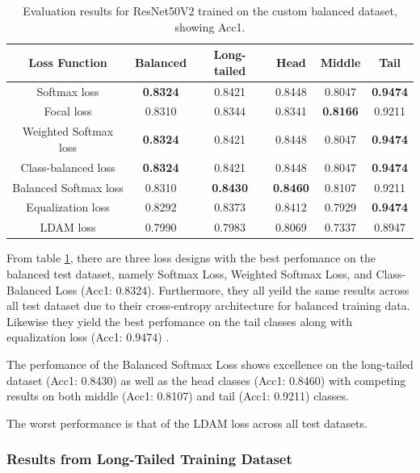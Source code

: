 \begin{table}[H]
    \centering
    \caption{Evaluation results for ResNet50V2 trained on the custom balanced dataset, showing Acc1.}
    \begin{tabular}{cccccc}
        \toprule
        Loss Function & Balanced & Long-tailed & Head & Middle & Tail \\ 
        \midrule
        Softmax loss   & \textbf{0.8324}  & 0.8421 & 0.8448 & 0.8047 & \textbf{0.9474} \\
        Focal loss   & 0.8310  & 0.8344 & 0.8341 & \textbf{0.8166} & 0.9211 \\
        Weighted Softmax loss   & \textbf{0.8324} & 0.8421 & 0.8448 & 0.8047 & \textbf{0.9474} \\
        Class-balanced loss   &  \textbf{0.8324} & 0.8421 & 0.8448 & 0.8047 & \textbf{0.9474} \\
        Balanced Softmax loss   & 0.8310 & \textbf{0.8430} & \textbf{0.8460} & 0.8107 & 0.9211 \\
        Equalization loss   & 0.8292 & 0.8373 & 0.8412 & 0.7929 & \textbf{0.9474} \\
        LDAM loss   & 0.7990 & 0.7983 & 0.8069 & 0.7337 & 0.8947 \\
        \bottomrule
    \end{tabular}
    \label{tab:resnet_bal_acc1_1}
\end{table}

From table \ref{tab:resnet_bal_acc1_1}, there are three loss designs with the best perfomance on the balanced test dataset, namely Softmax Loss, Weighted Softmax Loss, and Class-Balanced Loss (Acc1: 0.8324). Furthermore, they all yeild the same results across all test dataset due to their cross-entropy architecture for balanced training data. Likewise they yield the best perfomance on the tail classes along with equalization loss (Acc1: 0.9474) . %

The perfomance of the Balanced Softmax Loss shows excellence on the long-tailed dataset (Acc1: 0.8430) as well as the head classes (Acc1: 0.8460) with competing results on both middle (Acc1: 0.8107) and tail (Acc1: 0.9211) classes.

The worst performance is that of the LDAM loss across all test datasets.

\subsubsection{Results from Long-Tailed Training Dataset}

